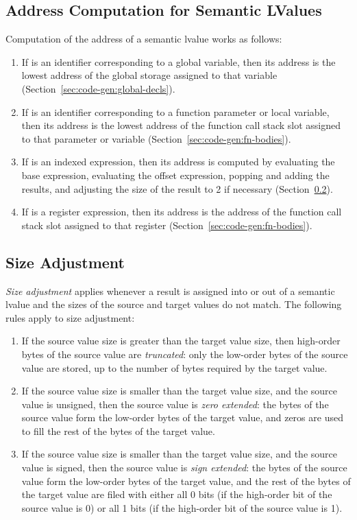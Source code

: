 \documentclass[10pt]{article}
\begin{document}
\subsection{Address Computation for Semantic LValues}
\label{sec:code-gen:lvalues}

Computation of the address of a semantic lvalue  works
as follows:
%
\begin{enumerate}
%
\item If  is an identifier corresponding to a global
  variable, then its address is the lowest address of the global
  storage assigned to that variable
  (Section~\ref{sec:code-gen:global-decls}). 
%
\item If  is an identifier corresponding to a function
  parameter or local variable, then its address is the lowest address
  of the function call stack slot assigned to that parameter or
  variable (Section~\ref{sec:code-gen:fn-bodies}).
%
\item If  is an indexed expression, then its address is
  computed by evaluating the base expression, evaluating the offset
  expression, popping and adding the results, and adjusting the size
  of the result to 2 if necessary
  (Section~\ref{sec:code-gen:size-adjustment}). 
%
\item If  is a register expression, then its address is
  the address of the function call stack slot assigned to that
  register (Section~\ref{sec:code-gen:fn-bodies}).
%
\end{enumerate}


\subsection{Size Adjustment}
\label{sec:code-gen:size-adjustment}

\emph{Size adjustment} applies whenever a result is assigned into or
out of a semantic lvalue and the sizes of the source and target values
do not match.  The following rules apply to size adjustment:
%
\begin{enumerate}
%
\item If the source value size is greater than the target value size,
  then high-order bytes of the source value are \emph{truncated}: only
  the low-order bytes of the source value are stored, up to the number
  of bytes required by the target value.
%
\item If the source value size is smaller than the target value size,
  and the source value is unsigned, then the source value is
  \emph{zero extended}:  the bytes of the source value form the
  low-order bytes of the target value, and zeros are used to fill the
  rest of the bytes of the target value.
%
\item If the source value size is smaller than the target value size,
  and the source value is signed, then the source value is \emph{sign
    extended}: the bytes of the source value form the low-order bytes
  of the target value, and the rest of the bytes of the target value
  are filed with either all 0 bits (if the high-order bit of the
  source value is 0) or all 1 bits (if the high-order bit of the
  source value is 1).
%
\end{enumerate}
\end{document}
